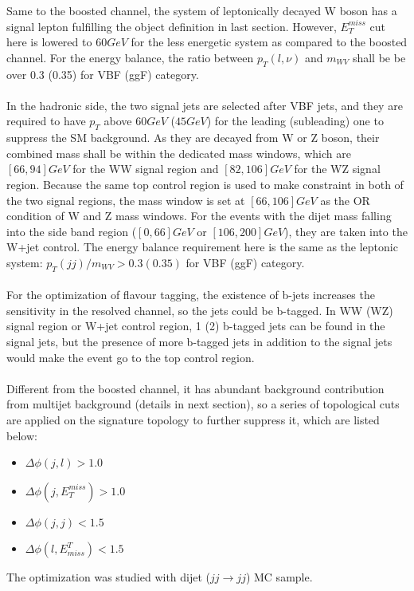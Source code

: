 Same to the boosted channel, the system of leptonically decayed W boson has a signal lepton fulfilling the object definition in last section. However, $E_{T}^{miss}$ cut here is lowered to $60GeV$ for the less energetic system as compared to the boosted channel. For the energy balance, the ratio between $p_{T}(l,\nu)$ and $m_{WV}$ shall be be over 0.3 (0.35) for VBF (ggF) category. 
\\
\\In the hadronic side, the two signal jets are selected after VBF jets, and they are required to have $p_{T}$ above $60GeV$ ($45GeV$) for the leading (subleading) one to suppress the SM background. As they are decayed from W or Z boson, their combined mass shall be within the dedicated mass windows, which are $[66, 94]GeV$ for the WW signal region and $[82, 106]GeV$ for the WZ signal region. Because the same top control region is used to make constraint in both of the two signal regions, the mass window is set at $[66,106]GeV$ as the OR condition of W and Z mass windows. For the events with the dijet mass falling into the side band region ($[0,66]GeV$ or $[106,200]GeV$), they are taken into the W+jet control. The energy balance requirement here is the same as the leptonic system: $p_{T}(jj)/m_{WV}>0.3(0.35)$ for VBF (ggF) category. 
\\
\\For the optimization of flavour tagging, the existence of b-jets increases the sensitivity in the resolved channel, so the jets could be b-tagged. In WW (WZ) signal region or W+jet control region, 1 (2) b-tagged jets can be found in the signal jets, but the presence of more b-tagged jets in addition to the signal jets would make the event go to the top control region.
\\
\\Different from the boosted channel, it has abundant background contribution from multijet background (details in next section), so a series of topological cuts are applied on the signature topology to further suppress it, which are listed below:
\begin{itemize}
	\item $\Delta\phi(j,l)>1.0$
	\item $\Delta\phi(j,E^{miss}_{T})>1.0$
	\item $\Delta\phi(j,j)<1.5$
	\item $\Delta\phi(l,E^{T}_{miss})<1.5$
\end{itemize}
The optimization was studied with dijet ($jj\rightarrow jj$) MC sample. 
\\
